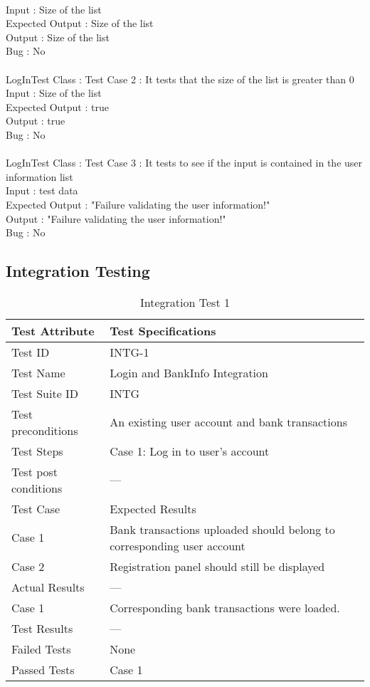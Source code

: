 \documentclass{article}
\begin{document}
\\Input : Size of the list
\\Expected Output : Size of the list
\\Output : Size of the list
\\Bug : No
\\\\LogInTest Class : Test Case 2 : It tests that the size of the list is greater than 0
\\Input : Size of the list
\\Expected Output : true
\\Output : true
\\Bug : No
\\\\LogInTest Class : Test Case 3 : It tests to see if the input is contained in the user information list
\\Input : test data
\\Expected Output : "Failure validating the user information!"
\\Output : "Failure validating the user information!"
\\Bug : No

\break

\subsection{Integration Testing}




\begin{table}[htbp]
\begin{center}
\begin{tabular}{|l | l|}
\hline
Test Attribute & Test Specifications \\
\hline
Test ID & INTG-1 \\
\hline
Test Name  & Login and BankInfo Integration \\
\hline
Test Suite  ID & INTG \\
\hline
Test preconditions & An existing user account and bank transactions \\
\hline
Test Steps & Case 1: Log in to user's account \\

\hline
Test post conditions & --- \\
\hline
Test Case & Expected Results\\
\hline
Case 1  &  Bank transactions uploaded should belong to corresponding user account  \\
\hline
  Case 2 &  Registration panel should still be displayed  \\
\hline
Actual Results & ---\\
\hline
Case 1  & Corresponding bank transactions were loaded.  \\
\hline
Test Results & ---\\
\hline
Failed Tests & None\\
\hline
Passed Tests & Case 1 \\
\hline
\end{tabular}
\end{center}
\caption{Integration Test 1}
\end{table}
\label{table:2a -intg}
\end{document}
